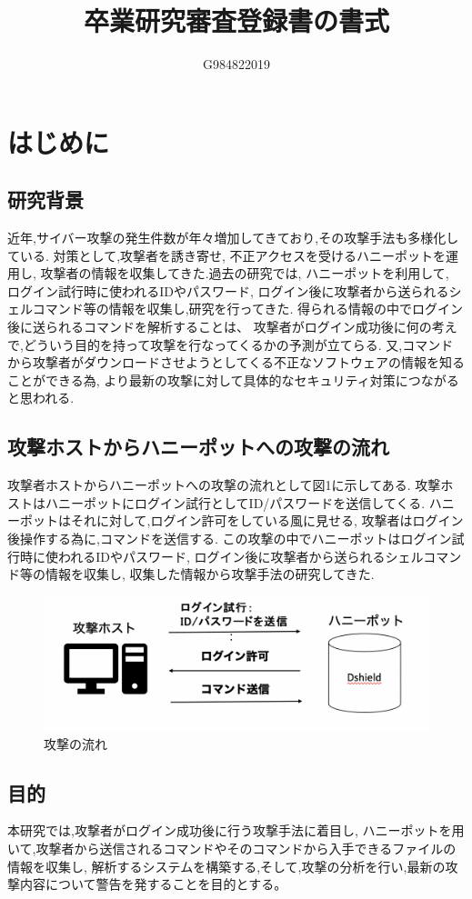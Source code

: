 \documentclass{entry}
\title{卒業研究審査登録書の書式}
\author{G984822019}{吉村　直将}
\begin{document}
\maketitle

\section{はじめに}
\subsection{研究背景}
近年,サイバー攻撃の発生件数が年々増加してきており,その攻撃手法も多様化している.
対策として,攻撃者を誘き寄せ,
不正アクセスを受けるハニーポットを運用し,
攻撃者の情報を収集してきた.過去の研究では,
ハニーポットを利用して,
ログイン試行時に使われるIDやパスワード,
ログイン後に攻撃者から送られるシェルコマンド等の情報を収集し,研究を行ってきた.
得られる情報の中でログイン後に送られるコマンドを解析することは、
攻撃者がログイン成功後に何の考えで,どういう目的を持って攻撃を行なってくるかの予測が立てらる.
又,コマンドから攻撃者がダウンロードさせようとしてくる不正なソフトウェアの情報を知ることができる為,
より最新の攻撃に対して具体的なセキュリティ対策につながると思われる.

\subsection{攻撃ホストからハニーポットへの攻撃の流れ}
攻撃者ホストからハニーポットへの攻撃の流れとして図1に示してある.
攻撃ホストはハニーポットにログイン試行としてID/パスワードを送信してくる.
ハニーポットはそれに対して,ログイン許可をしている風に見せる,
攻撃者はログイン後操作する為に,コマンドを送信する.
この攻撃の中でハニーポットはログイン試行時に使われるIDやパスワード,
ログイン後に攻撃者から送られるシェルコマンド等の情報を収集し,
収集した情報から攻撃手法の研究してきた.　
\begin{figure}[htbp]
	\centering
	\includegraphics[width=\hsize]{honeypot.png}
	\caption{攻撃の流れ}
\end{figure}
\subsection{目的}
本研究では,攻撃者がログイン成功後に行う攻撃手法に着目し,
ハニーポットを用いて,攻撃者から送信されるコマンドやそのコマンドから入手できるファイルの情報を収集し,
解析するシステムを構築する,そして,攻撃の分析を行い,最新の攻撃内容について警告を発することを目的とする。
\end{document}
